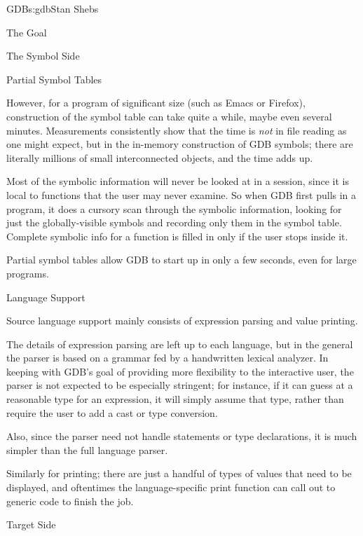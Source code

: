 \begin{aosachapter}{GDB}{s:gdb}{Stan Shebs}
\begin{aosasect1}{The Goal}
\begin{aosasect1}{The Symbol Side}
\end{aosasect1}

\begin{aosasect2}{Partial Symbol Tables}

However, for a program of significant size (such as Emacs or Firefox),
construction of the symbol table can take quite a while, maybe even
several minutes.  Measurements consistently show that the time is
{\em not} in file reading as one might expect, but in the in-memory
construction of GDB symbols; there are literally millions of small
interconnected objects, and the time adds up.

Most of the symbolic information will never be looked at in a session,
since it is local to functions that the user may never examine.  So
when GDB first pulls in a program, it does a cursory scan through the
symbolic information, looking for just the globally-visible symbols
and recording only them in the symbol table.  Complete symbolic info
for a function is filled in only if the user stops inside it.

Partial symbol tables allow GDB to start up in only a few seconds, even
for large programs.

\end{aosasect2}

\begin{aosasect2}{Language Support}

Source language support mainly consists of expression parsing and value
printing.

The details of expression parsing are left up to each language, but in
the general the parser is based on a  grammar fed by a handwritten
lexical analyzer.  In keeping with GDB's goal of providing more
flexibility to the interactive user, the parser is not expected to be
especially stringent; for instance, if it can guess at a reasonable
type for an expression, it will simply assume that type, rather than
require the user to add a cast or type conversion.

Also, since the parser need not handle statements or type
declarations, it is much simpler than the full language parser.

Similarly for printing; there are just a handful of types of values
that need to be displayed, and oftentimes the language-specific print
function can call out to generic code to finish the job.

\end{aosasect2}

\begin{aosasect1}{Target Side}


\end{aosasect1}
\end{aosasect1}
\end{aosachapter}
